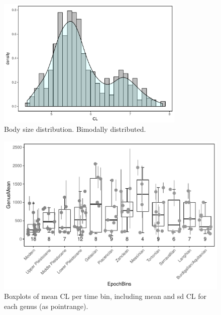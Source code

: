 \FloatBarrier


\begin{figure}[htbp]
	\centering
	\includegraphics[width=0.8\textwidth]{MA_JJ_files/figure-latex/HistAll-1.pdf}
	\caption[CL distribution]{Body size distribution. Bimodally distributed.}
	\label{fig:histAll}
\end{figure}



\FloatBarrier

\begin{figure}[htbp]
	\centering
	\includegraphics{MA_JJ_files/figure-latex/BPGBins-1.pdf}
	\caption{Boxplots of mean CL per time bin, including mean and sd CL for
		each genus (as pointrange).}
	\label{fig:boxBins}
\end{figure}


